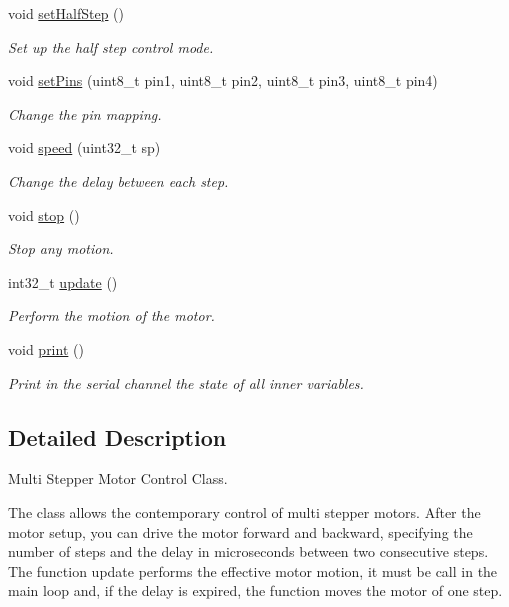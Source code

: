 \begin{DoxyCompactItemize}
void \hyperlink{class_s_motor_a1c4101303e66c321fbaf0f7969906910}{set\+Half\+Step} ()
\begin{DoxyCompactList}\small\item\em Set up the half step control mode. \end{DoxyCompactList}\item 
void \hyperlink{class_s_motor_a9d76c875ebc8686bf6d1bc70aba7b652}{set\+Pins} (uint8\+\_\+t pin1, uint8\+\_\+t pin2, uint8\+\_\+t pin3, uint8\+\_\+t pin4)
\begin{DoxyCompactList}\small\item\em Change the pin mapping. \end{DoxyCompactList}\item 
void \hyperlink{class_s_motor_af87213cf4f416f8182a299e193c28fdc}{speed} (uint32\+\_\+t sp)
\begin{DoxyCompactList}\small\item\em Change the delay between each step. \end{DoxyCompactList}\item 
void \hyperlink{class_s_motor_afc966d69cfe8f90a0c640e1e24f7b2c6}{stop} ()
\begin{DoxyCompactList}\small\item\em Stop any motion. \end{DoxyCompactList}\item 
int32\+\_\+t \hyperlink{class_s_motor_a4aee8957f93b071ea7772e5d2c766500}{update} ()
\begin{DoxyCompactList}\small\item\em Perform the motion of the motor. \end{DoxyCompactList}\item 
void \hyperlink{class_s_motor_a70f9d62a3979a923b1e7c90deae30853}{print} ()
\begin{DoxyCompactList}\small\item\em Print in the serial channel the state of all inner variables. \end{DoxyCompactList}\end{DoxyCompactItemize}


\subsection{Detailed Description}
Multi Stepper Motor Control Class. 

The class allows the contemporary control of multi stepper motors. After the motor setup, you can drive the motor forward and backward, specifying the number of steps and the delay in microseconds between two consecutive steps. The function update performs the effective motor motion, it must be call in the main loop and, if the delay is expired, the function moves the motor of one step. 


